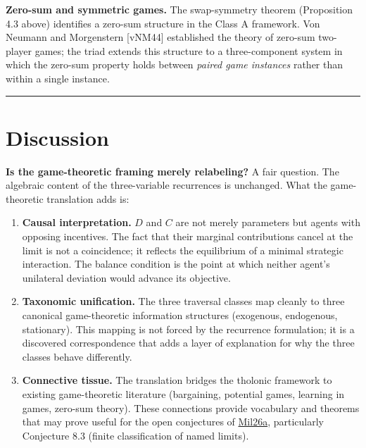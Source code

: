 \documentclass[12pt]{article}
\begin{document}
\textbf{Zero-sum and symmetric games.} The swap-symmetry theorem
(Proposition 4.3 above) identifies a zero-sum structure in the Class A
framework. Von Neumann and Morgenstern {[}vNM44{]} established the
theory of zero-sum two-player games; the triad extends this structure to
a three-component system in which the zero-sum property holds between
\emph{paired game instances} rather than within a single instance.

\begin{center}\rule{0.5\linewidth}{0.5pt}\end{center}

\section{Discussion}\label{discussion}

\textbf{Is the game-theoretic framing merely relabeling?} A fair
question. The algebraic content of the three-variable recurrences is
unchanged. What the game-theoretic translation adds is:

\begin{enumerate}
\def\labelenumi{\arabic{enumi}.}
\item
  \textbf{Causal interpretation.} \(D\) and \(C\) are not merely
  parameters but agents with opposing incentives. The fact that their
  marginal contributions cancel at the limit is not a coincidence; it
  reflects the equilibrium of a minimal strategic interaction. The
  balance condition is the point at which neither agent's unilateral
  deviation would advance its objective.
\item
  \textbf{Taxonomic unification.} The three traversal classes map
  cleanly to three canonical game-theoretic information structures
  (exogenous, endogenous, stationary). This mapping is not forced by the
  recurrence formulation; it is a discovered correspondence that adds a
  layer of explanation for why the three classes behave differently.
\item
  \textbf{Connective tissue.} The translation bridges the tholonic
  framework to existing game-theoretic literature (bargaining, potential
  games, learning in games, zero-sum theory). These connections provide
  vocabulary and theorems that may prove useful for the open conjectures
  of
  \href{https://github.com/baardev/truevalue/blob/main/docnav/Research/papers/1_recursive-tholonic-five-constants/1_recursive-tholonic-five-constants.pdf}{Mil26a},
  particularly Conjecture 8.3 (finite classification of named limits).
\end{enumerate}
\end{document}

